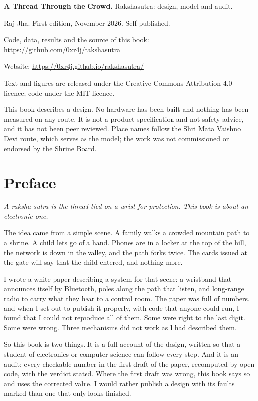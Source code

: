 \documentclass[11pt,a4paper,twoside,openany]{book}
\newcommand{\hook}[1]{{\noindent\fontsize{13}{19}\selectfont\itshape\color{rsmuted}#1\par}\vspace{12pt}}
\begin{document}
\thispagestyle{empty}\vspace*{\fill}
{\small\noindent\textbf{A Thread Through the Crowd.} Rakshasutra: design, model and audit.\par\medskip
\noindent Raj Jha. First edition, November 2026. Self-published.\par\medskip
\noindent Code, data, results and the source of this book: \url{https://github.com/0xr4j/rakshasutra}\par
\noindent Website: \url{https://0xr4j.github.io/rakshasutra/}\par\medskip
\noindent Text and figures are released under the Creative Commons Attribution 4.0 licence; code under the MIT
licence.\par\medskip
\noindent This book describes a design. No hardware has been built and nothing has been measured on any route. It is
not a product specification and not safety advice, and it has not been peer reviewed. Place names follow the Shri Mata
Vaishno Devi route, which serves as the model; the work was not commissioned or endorsed by the Shrine Board.\par}
\clearpage

\chapter*{Preface}
\hook{A \emph{raksha sutra} is the thread tied on a wrist for protection. This book is about an electronic one.}
The idea came from a simple scene. A family walks a crowded mountain path to a shrine. A child lets go of a hand. Phones
are in a locker at the top of the hill, the network is down in the valley, and the path forks twice. The cards issued at
the gate will say that the child entered, and nothing more.

I wrote a white paper describing a system for that scene: a wristband that announces itself by Bluetooth, poles along
the path that listen, and long-range radio to carry what they hear to a control room. The paper was full of numbers,
and when I set out to publish it properly, with code that anyone could run, I found that I could not reproduce all of
them. Some were right to the last digit. Some were wrong. Three mechanisms did not work as I had described them.

So this book is two things. It is a full account of the design, written so that a student of electronics or computer
science can follow every step. And it is an audit: every checkable number in the first draft of the paper, recomputed
by open code, with the verdict stated. Where the first draft was wrong, this book says so and uses the corrected value.
I would rather publish a design with its faults marked than one that only looks finished.
\end{document}
